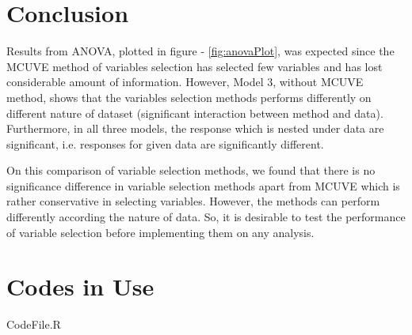 \documentclass[10pt, a4paper]{article}\usepackage[]{graphicx}\usepackage[]{color}
\begin{document}
\section{Conclusion}
Results from ANOVA, plotted in figure - \ref{fig:anovaPlot}, was expected since the MCUVE method of variables selection has selected few variables and has lost considerable amount of information. However, Model 3, without MCUVE method, shows that the variables selection methods performs differently on different nature of dataset (significant interaction between method and data). Furthermore, in all three models, the response which is nested under data are significant, i.e. responses for given data are significantly different.

On this comparison of variable selection methods, we found that there is no significance difference in variable selection methods apart from MCUVE which is rather conservative in selecting variables. However, the methods can perform differently according the nature of data. So, it is desirable to test the performance of variable selection before implementing them on any analysis.

\appendix


\section{Codes in Use}

{CodeFile.R}


\printbibliography
\end{document}
